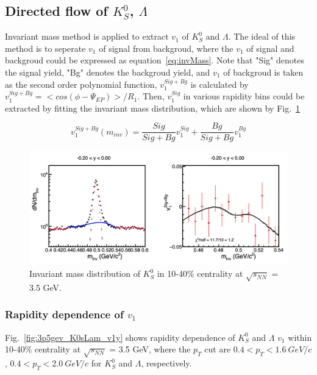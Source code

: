 \subsection{Directed flow of $K^{0}_{S}$, $\Lambda$}

Invariant mass method is applied to extract $v_1$ of $K^{0}_{S}$ and $\Lambda$. 
The ideal of this method is to seperate $v_1$ of signal from backgroud,  
where the $v_1$ of signal and backgroud could be expressed as equation~\ref{eq:invMass}.
Note that "Sig" denotes the signal yield, "Bg" denotes the backgroud yield, 
and $v_1$ of backgroud is taken as the second order polynomial function, 
$v_1^{Sig+Bg}$ is calculated by $v_1^{Sig+Bg} = <cos(\phi-\Psi_{EP})>/R_1$.
Then, $v_1^{Sig}$ in various rapidity bins could be extracted by fitting the invariant mass distribution,
which are shown by Fig.~\ref{fig:3p5gev_K0s_invMass}


\begin{equation}
v_1^{S i g+B g}\left(m_{i n v}\right)=\frac{S i g}{S i g+B g} v_1^{S i g}+\frac{B g}{S i g+B g} v_1^{B g}
\label{eq:invMass}
\end{equation}

\begin{figure}[hbt!]
\centering
\includegraphics[width=0.85\linewidth]{figures/chapter03/3p5gev_K0s_invMass.png}
\caption{Invariant mass distribution of $K_S^0$ in 10-40\% centrality at $\sqrt{s_{NN}}$ = 3.5 GeV.}
\label{fig:3p5gev_K0s_invMass}
\end{figure}

\subsubsection{Rapidity dependence of $v_1$}

Fig.~\ref{fig:3p5gev_K0sLam_v1y} shows rapidity dependence of $K^0_S$ and $\Lambda$ $v_1$ within 10-40\% centrality at $\sqrt{s_{NN}}$ = 3.5 GeV,
where the $p_T$ cut are $0.4 < p_T < 1.6~GeV/c$, $0.4 < p_T < 2.0~GeV/c$ for $K^0_S$ and $\Lambda$, respectively. 

